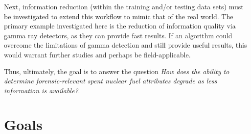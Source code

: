 Next, information reduction (within the training and/or testing data sets) must
be investigated to extend this workflow to mimic that of the real world. The
primary example investigated here is the reduction of information quality via
gamma ray detectors, as they can provide fast results.  If an algorithm could
overcome the limitations of gamma detection and still provide useful results,
this would warrant further studies and perhaps be field-applicable.

Thus, ultimately, the goal is to answer the question \textit{How
does the ability to determine forensic-relevant spent nuclear fuel attributes
degrade as less information is available?}. 

\section{Goals}

